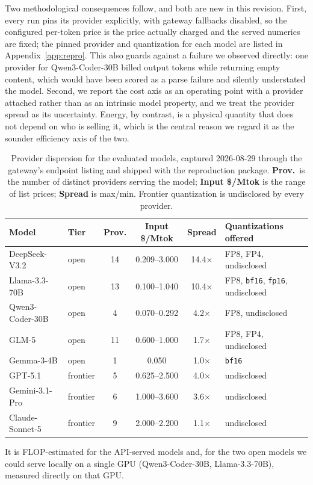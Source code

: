 \documentclass[computers,article,submit,moreauthors]{Definitions/mdpi}
\begin{document}
Two methodological consequences follow, and both are new in this revision. First, every run pins its provider explicitly, with gateway fallbacks disabled, so the configured per-token price is the price actually charged and the served numerics are fixed; the pinned provider and quantization for each model are listed in Appendix~\ref{app:repro}. This also guards against a failure we observed directly: one provider for Qwen3-Coder-30B billed output tokens while returning empty content, which would have been scored as a parse failure and silently understated the model. Second, we report the cost axis as an operating point with a provider attached rather than as an intrinsic model property, and we treat the provider spread as its uncertainty. Energy, by contrast, is a physical quantity that does not depend on who is selling it, which is the central reason we regard it as the sounder efficiency axis of the two.

\begin{table}[H]
\caption{Provider dispersion for the evaluated models, captured 2026-08-29 through the gateway's endpoint listing and shipped with the reproduction package. \textbf{Prov.}\ is the number of distinct providers serving the model; \textbf{Input \$/Mtok} is the range of list prices; \textbf{Spread} is max/min. Frontier quantization is undisclosed by every provider.\label{tab:price-dispersion}}
\begin{tabularx}{\textwidth}{llCCCX}
\toprule
\textbf{Model} & \textbf{Tier} & \textbf{Prov.} & \textbf{Input \$/Mtok} & \textbf{Spread} & \textbf{Quantizations offered}\\
\midrule
DeepSeek-V3.2 & open & 14 & 0.209--3.000 & 14.4$\times$ & FP8, FP4, undisclosed\\
Llama-3.3-70B & open & 13 & 0.100--1.040 & 10.4$\times$ & FP8, \texttt{bf16}, \texttt{fp16}, undisclosed\\
Qwen3-Coder-30B & open & 4 & 0.070--0.292 & 4.2$\times$ & FP8, undisclosed\\
GLM-5 & open & 11 & 0.600--1.000 & 1.7$\times$ & FP8, FP4, undisclosed\\
Gemma-3-4B & open & 1 & 0.050 & 1.0$\times$ & \texttt{bf16}\\
\midrule
GPT-5.1 & frontier & 5 & 0.625--2.500 & 4.0$\times$ & undisclosed\\
Gemini-3.1-Pro & frontier & 6 & 1.000--3.600 & 3.6$\times$ & undisclosed\\
Claude-Sonnet-5 & frontier & 9 & 2.000--2.200 & 1.1$\times$ & undisclosed\\
\bottomrule
\end{tabularx}
\end{table} It is FLOP-estimated for the API-served models and, for the two open models we could serve locally on a single GPU (Qwen3-Coder-30B, Llama-3.3-70B), measured directly on that GPU.
\end{document}

